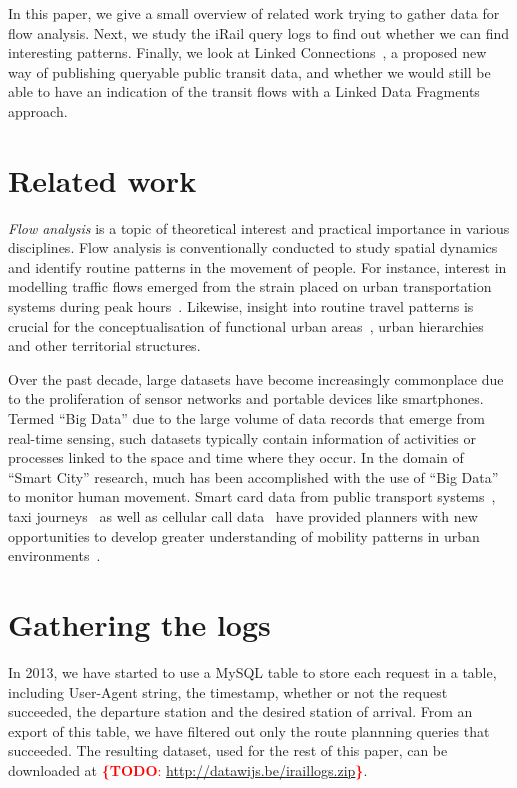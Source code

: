 \documentclass{sig-alternate}
\newcommand{\todo}[1]{\noindent\textcolor{red}{{\bf \{TODO}: #1{\bf \}}}}
\begin{document}
In this paper, we give a small overview of related work trying to gather data for flow analysis.
Next, we study the iRail query logs to find out whether we can find interesting patterns.
Finally, we look at Linked Connections~\cite{lc}, a proposed new way of publishing queryable public transit data, and whether we would still be able to have an indication of the transit flows with a Linked Data Fragments~\cite{ldf} approach.

\section{Related work}
\label{sec:relwork}

\emph{Flow analysis} is a topic of theoretical interest and practical importance in various disciplines. 
Flow analysis is conventionally conducted to study spatial dynamics and identify routine patterns in the movement of people.
For instance, interest in modelling traffic flows emerged from the strain placed on urban transportation systems during peak hours~\cite{roth,ferreira}.
Likewise, insight into routine travel patterns is crucial for the conceptualisation of functional urban areas~\cite{servillo,sykora}, urban hierarchies~\cite{christaller} and other territorial structures.

Over the past decade, large datasets have become increasingly commonplace due to the proliferation of sensor networks and portable devices like smartphones.
Termed ``Big Data'' due to the large volume of data records that emerge from real-time sensing\cite{kitchin}, such datasets typically contain information of activities or processes linked to the space and time where they occur.
In the domain of ``Smart City'' research, much has been accomplished with the use of ``Big Data'' to monitor human movement.
Smart card data from public transport systems~\cite{roth,beecham}, taxi journeys~\cite{ferreira} as well as cellular call data~\cite{sevtsuk} have provided planners with new opportunities to develop greater understanding of mobility patterns in urban environments~\cite{batty}.

\section{Gathering the logs}
\label{sec:logs}

In 2013, we have started to use a MySQL table to store each request in a table, including User-Agent string, the timestamp, whether or not the request succeeded, the departure station and the desired station of arrival.
From an export of this table, we have filtered out only the route plannning queries that succeeded.
The resulting dataset, used for the rest of this paper, can be downloaded at \todo{\url{http://datawijs.be/iraillogs.zip}}.
\end{document}
